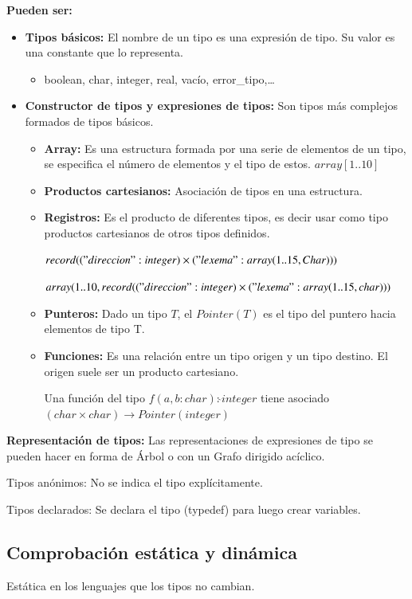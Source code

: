 \documentclass[12pt, twoside, openright]{report} %
\begin{document}
\textbf{Pueden ser:}
\begin{itemize}
	\item \textbf{Tipos básicos:} El nombre de un tipo es una expresión de tipo. Su valor es una constante que lo representa.
	      \begin{itemize}
		      \item boolean, char, integer, real, vacío, error\_tipo,\dots
	      \end{itemize}
	\item \textbf{Constructor de tipos y expresiones de tipos:} Son tipos más complejos formados de tipos básicos.
	      \begin{itemize}
		      \item \textbf{Array:} Es una estructura formada por una serie de elementos de un tipo, se especifica el número de elementos y el tipo de estos. $array[1\text{..}10]$
		      \item \textbf{Productos cartesianos:} Asociación de tipos en una estructura.
		      \item \textbf{Registros:} Es el producto de diferentes tipos, es decir usar como tipo productos cartesianos de otros tipos definidos.

		            $record (("direccion" : integer) \times ("lexema" : array(1..15, Char)))$

		            $array(1\text{..}10, record (("direccion" : integer) \times ("lexema" : array(1\text{..}15,char)))$
		      \item \textbf{Punteros:} Dado un tipo $T$, el $Pointer(T)$ es el tipo del puntero hacia elementos de tipo T.
		      \item \textbf{Funciones:} Es una relación entre un tipo origen y un tipo destino. El origen suele ser un producto cartesiano.

		            Una función del tipo $f(a,b:char) : \hat{} integer$ tiene asociado $(char \times char) \rightarrow Pointer(integer)$
	      \end{itemize}
\end{itemize}
\textbf{Representación de tipos:}
Las representaciones de expresiones de tipo se pueden hacer en forma de Árbol o con un Grafo dirigido acíclico.

Tipos anónimos: No se indica el tipo explícitamente.

Tipos declarados: Se declara el tipo (typedef) para luego crear variables.


\subsection{Comprobación estática y dinámica}
Estática en los lenguajes que los tipos no cambian.
\end{document}

